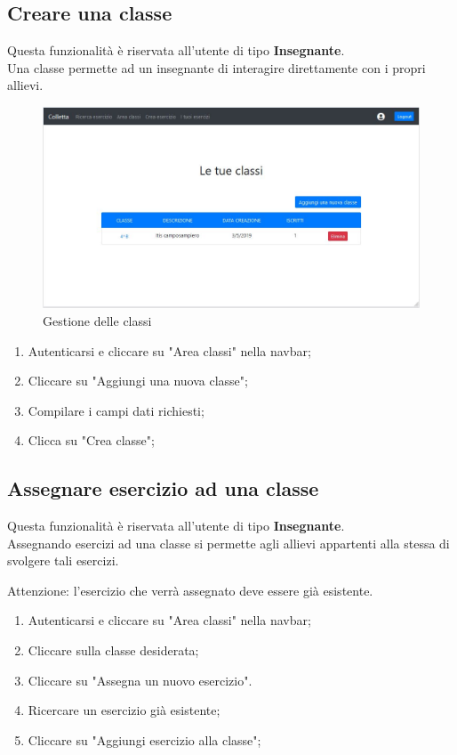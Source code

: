 \documentclass[11pt,a4paper]{article}
\begin{document}
{	\subsection{Creare una classe}
		Questa funzionalità è riservata all'utente di tipo \textbf{Insegnante}.\\
		Una classe permette ad un insegnante di interagire direttamente con i propri allievi.
		
			\begin{figure}[h!]
				\centering
				\includegraphics[scale=0.65]{images/classi.jpg}
				\caption{Gestione delle classi}
			\end{figure}
	
		\begin{enumerate}
			\item Autenticarsi e cliccare su "Area classi" nella navbar;
			\item Cliccare su "Aggiungi una nuova classe";
			\item Compilare i campi dati richiesti;
			\item Clicca su "Crea classe";
		\end{enumerate}
	
	\subsection{Assegnare esercizio ad una classe}
		Questa funzionalità è riservata all'utente di tipo \textbf{Insegnante}.\\
		Assegnando esercizi ad una classe si permette agli allievi appartenti alla stessa di svolgere tali esercizi.
		
		Attenzione: l'esercizio che verrà assegnato deve essere già esistente.
		
		\begin{enumerate}
			\item Autenticarsi e cliccare su "Area classi" nella navbar;
			\item Cliccare sulla classe desiderata;
			\item Cliccare su "Assegna un nuovo esercizio".
			\item Ricercare un esercizio già esistente;
			\item Cliccare su "Aggiungi esercizio alla classe";
		\end{enumerate}
		
}
\end{document}
